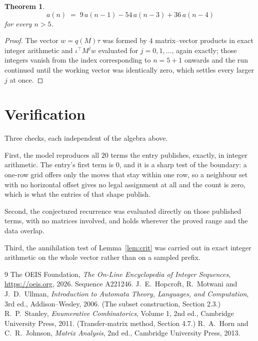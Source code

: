 \documentclass[11pt,a4paper]{article}
\theoremstyle{plain}
\newtheorem{theorem}{Theorem}
\theoremstyle{definition}
\begin{document}
\begin{theorem}
\[
a(n)\;=\;9\,a(n-1) - 54\,a(n-3) + 36\,a(n-4)
\]
for every $n>5$.
\end{theorem}

\begin{proof}
The vector $w=q(M)\tau$ was formed by $4$ matrix--vector products in exact integer
arithmetic and $\iota^{\!\top}M^{j}w$ evaluated for $j=0,1,\dots$, again exactly; those
integers vanish from the index corresponding to $n=5+1$ onwards and the run continued
until the working vector was identically zero, which settles every larger $j$ at once.
\end{proof}

\section{Verification}

Three checks, each independent of the algebra above.

First, the model reproduces all $20$ terms the entry publishes, exactly, in integer
arithmetic. The entry's first term is $0$, and it is a sharp test of the boundary: a
one-row grid offers only the moves that stay within one row, so a neighbour set with no
horizontal offset gives no legal assignment at all and the count is zero, which is what the
entries of that shape publish.

Second, the conjectured recurrence was evaluated directly on those published terms, with no
matrices involved, and holds wherever the proved range and the data overlap.

Third, the annihilation test of Lemma~\ref{lem:crit} was carried out in exact integer
arithmetic on the whole vector rather than on a sampled prefix.

\begin{thebibliography}{9}
 The OEIS Foundation, \emph{The On-Line Encyclopedia of Integer
Sequences}, \url{https://oeis.org}, 2026. Sequence A221246.
 J.~E.~Hopcroft, R.~Motwani and J.~D.~Ullman, \emph{Introduction to Automata
Theory, Languages, and Computation}, 3rd ed., Addison--Wesley, 2006. (The subset
construction, Section 2.3.)
 R.~P.~Stanley, \emph{Enumerative Combinatorics}, Volume 1, 2nd ed.,
Cambridge University Press, 2011. (Transfer-matrix method, Section 4.7.)
 R.~A.~Horn and C.~R.~Johnson, \emph{Matrix Analysis}, 2nd ed., Cambridge
University Press, 2013.
\end{thebibliography}
\end{document}
